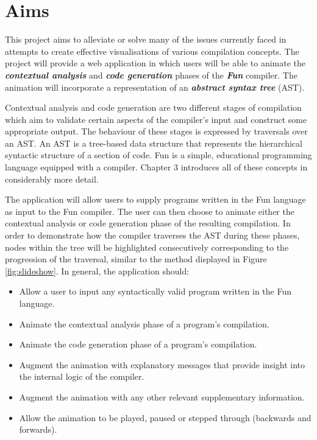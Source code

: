\documentclass{l4proj}
\begin{document}
\section{Aims}
This project aims to alleviate or solve many of the issues currently faced in attempts to create effective visualisations of various compilation concepts. The project will provide a web application in which users will be able to animate the \textit{\textbf{contextual analysis}} and \textit{\textbf{code generation}} phases of the \textit{\textbf{Fun}} compiler. The animation will incorporate a representation of an \textit{\textbf{abstract syntax tree}} (AST). 

Contextual analysis and code generation are two different stages of compilation which aim to validate certain aspects of the compiler's input and construct some appropriate output. The behaviour of these stages is expressed by traversals over an AST. An AST is a tree-based data structure that represents the hierarchical syntactic structure of a section of code. Fun is a simple, educational programming language equipped with a compiler. Chapter 3 introduces all of these concepts in considerably more detail. 

The application will allow users to supply programs written in the Fun language as input to the Fun compiler. The user can then choose to animate either the contextual analysis or code generation phase of the resulting compilation. In order to demonstrate how the compiler traverses the AST during these phases, nodes within the tree will be highlighted consecutively corresponding to the progression of the traversal, similar to the method displayed in Figure \ref{fig:slideshow}. In general, the application should:
\begin{itemize}
\item Allow a user to input any syntactically valid program written in the Fun language.
\item Animate the contextual analysis phase of a program's compilation. 
\item Animate the code generation phase of a program's compilation.
\item Augment the animation with explanatory messages that provide insight into the internal logic of the compiler.
\item Augment the animation with any other relevant supplementary information.
\item Allow the animation to be played, paused or stepped through (backwards and forwards).
\end{itemize}
\end{document}
